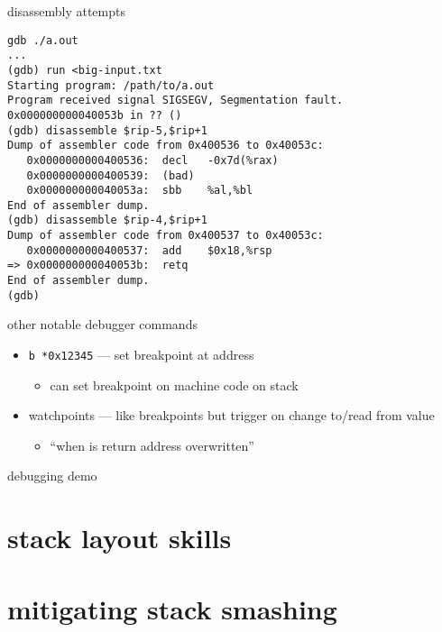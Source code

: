 \begin{frame}[fragile,label=badDisass]{disassembly attempts}
\begin{Verbatim}[fontsize=\fontsize{10}{11}\selectfont]
gdb ./a.out
...
(gdb) run <big-input.txt
Starting program: /path/to/a.out 
Program received signal SIGSEGV, Segmentation fault.
0x000000000040053b in ?? ()
(gdb) disassemble $rip-5,$rip+1
Dump of assembler code from 0x400536 to 0x40053c:
   0x0000000000400536:  decl   -0x7d(%rax)
   0x0000000000400539:  (bad)  
   0x000000000040053a:  sbb    %al,%bl
End of assembler dump.
(gdb) disassemble $rip-4,$rip+1
Dump of assembler code from 0x400537 to 0x40053c:
   0x0000000000400537:  add    $0x18,%rsp
=> 0x000000000040053b:  retq   
End of assembler dump.
(gdb)
\end{Verbatim}
\end{frame}

\begin{frame}[fragile,label=otherAss]{other notable debugger commands}
\begin{itemize}
\item \texttt{b *0x12345} --- set breakpoint at address
    \begin{itemize}
    \item can set breakpoint on machine code on stack
    \end{itemize}
\item watchpoints --- like breakpoints but trigger on change to/read from value
    \begin{itemize}
    \item ``when is return address overwritten''
    \end{itemize}
\end{itemize}
\end{frame}

\begin{frame}{debugging demo}
\end{frame}


\section{stack layout skills}


\section{mitigating stack smashing}


